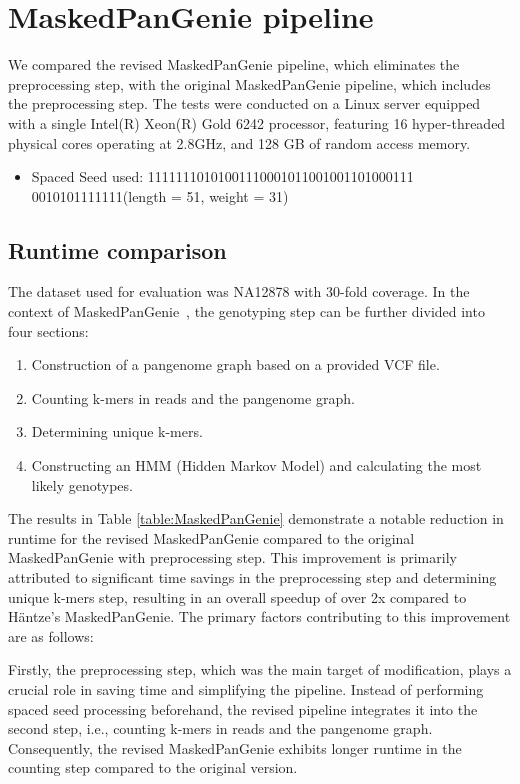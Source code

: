 \documentclass{PHlab-thesis}
\begin{document}
\section{MaskedPanGenie pipeline}
We compared the revised MaskedPanGenie pipeline, which eliminates the preprocessing step, with the original MaskedPanGenie pipeline, which includes the preprocessing step. The tests were conducted on a Linux server equipped with a single Intel(R) Xeon(R) Gold 6242 processor, featuring 16 hyper-threaded physical cores operating at 2.8GHz, and 128 GB of random access memory.
\begin{itemize}
    \item Spaced Seed used: 11111110101001110001011001001101000111\\0010101111111(length = 51, weight = 31)
\end{itemize}
\subsection{Runtime comparison}
The dataset used for evaluation was NA12878 with 30-fold coverage. In the context of MaskedPanGenie~\cite{haimo2023MaskedPanGenie}, the genotyping step can be further divided into four sections:
\begin{enumerate}[label=(\roman*)]
\item Construction of a pangenome graph based on a provided VCF file.
\item Counting k-mers in reads and the pangenome graph.
\item Determining unique k-mers.
\item Constructing an HMM (Hidden Markov Model) and calculating the most likely genotypes.
\end{enumerate}
The results in Table \ref{table:MaskedPanGenie} demonstrate a notable reduction in runtime for the revised MaskedPanGenie compared to the original MaskedPanGenie with preprocessing step. This improvement is primarily attributed to significant time savings in the preprocessing step and determining unique k-mers step, resulting in an overall speedup of over 2x compared to Häntze's MaskedPanGenie. The primary factors contributing to this improvement are as follows:

Firstly, the preprocessing step, which was the main target of modification, plays a crucial role in saving time and simplifying the pipeline. Instead of performing spaced seed processing beforehand, the revised pipeline integrates it into the second step, i.e., counting k-mers in reads and the pangenome graph. Consequently, the revised MaskedPanGenie exhibits longer runtime in the counting step compared to the original version.
\end{document}
